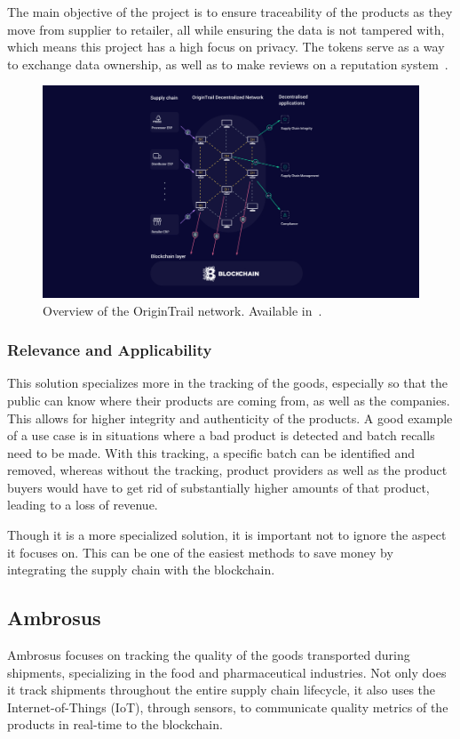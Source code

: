 The main objective of the project is to ensure traceability of the products as they move from supplier to retailer, all while ensuring the data is not tampered with, which means this project has a high focus on privacy. The tokens serve as a way to exchange data ownership, as well as to make reviews on a reputation system~\cite{Rakic2017}.

\begin{figure}[h]
\centering
\includegraphics[scale=0.5]{media/origin_trail_network.jpg}
\caption[Overview of the OriginTrail network.]{Overview of the OriginTrail network. Available in~\cite{OriginTrailTechno}.}
\label{fig:origintrail_network}
\end{figure}

\subsubsection{Relevance and Applicability}
This solution specializes more in the tracking of the goods, especially so that the public can know where their products are coming from, as well as the companies. This allows for higher integrity and authenticity of the products. A good example of a use case is in situations where a bad product is detected and batch recalls need to be made. With this tracking, a specific batch can be identified and removed, whereas without the tracking, product providers as well as the product buyers would have to get rid of substantially higher amounts of that product, leading to a loss of revenue.

Though it is a more specialized solution, it is important not to ignore the aspect it focuses on. This can be one of the easiest methods to save money by integrating the supply chain with the blockchain.


\subsection{Ambrosus}
Ambrosus focuses on tracking the quality of the goods transported during shipments, specializing in the food and pharmaceutical industries. Not only does it track shipments throughout the entire supply chain lifecycle, it also uses the Internet-of-Things (IoT), through sensors, to communicate quality metrics of the products in real-time to the blockchain. 

